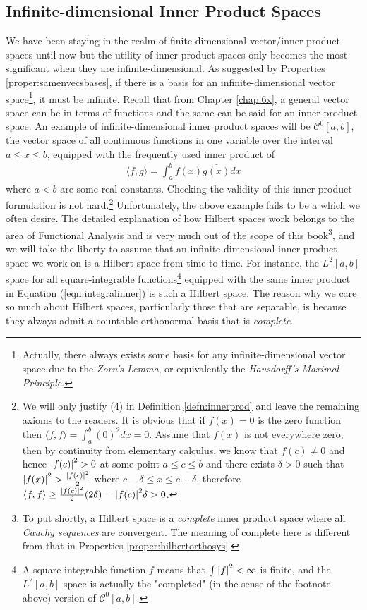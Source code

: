 \subsection{Infinite-dimensional Inner Product Spaces}
\label{section:infinner}

We have been staying in the realm of finite-dimensional vector/inner product spaces until now but the utility of inner product spaces only becomes the most significant when they are infinite-dimensional. As suggested by Properties \ref{proper:samenvecsbases}, if there is a basis for an infinite-dimensional vector space\footnote{Actually, there always exists some basis for any infinite-dimensional vector space due to the \textit{Zorn's Lemma}, or equivalently the \textit{Hausdorff's Maximal Principle}.}, it must be infinite. Recall that from Chapter \ref{chap:6x}, a general vector space can be in terms of functions and the same can be said for an inner product space. An example of infinite-dimensional inner product spaces will be $\mathcal{C}^0[a,b]$, the vector space of all continuous functions in one variable over the interval $a \leq x \leq b$, equipped with the frequently used inner product of
\begin{align}
\langle f,g \rangle = \int_a^b f(x) \overline{g(x)} dx \label{eqn:integralinner}
\end{align}
where $a < b$ are some real constants. Checking the validity of this inner product formulation is not hard.\footnote{We will only justify (4) in Definition \ref{defn:innerprod} and leave the remaining axioms to the readers. It is obvious that if $f(x) = 0$ is the zero function then $\langle f,f \rangle = \int_a^b (0)^2 dx = 0$. Assume that $f(x)$ is not everywhere zero, then by continuity from elementary calculus, we know that $f(c) \neq 0$ and hence $\abs{f(c)}^2 > 0$ at some point $a \leq c \leq b$ and there exists $\delta > 0$ such that $\abs{f(x)}^2 > \frac{\abs{f(c)}^2}{2}$ where $c-\delta \leq x \leq c+\delta$, therefore $\langle f,f \rangle \geq \frac{\abs{f(c)}^2}{2} (2\delta) = \abs{f(c)}^2 \delta > 0$.} 
Unfortunately, the above example fails to be a  which we often desire. The detailed explanation of how Hilbert spaces work belongs to the area of Functional Analysis and is very much out of the scope of this book\footnote{To put shortly, a Hilbert space is a \textit{complete} inner product space where all \textit{Cauchy sequences} are convergent. The meaning of complete here is different from that in Properties \ref{proper:hilbertorthosys}.}, and we will take the liberty to assume that an infinite-dimensional inner product space we work on is a  Hilbert space from time to time. For instance, the $L^2[a,b]$ space for all square-integrable functions\footnote{A square-integrable function $f$ means that $\int \abs{f}^2 < \infty$ is finite, and the $L^2[a,b]$ space is actually the "completed" (in the sense of the footnote above) version of $\mathcal{C}^0[a,b]$.} equipped with the same inner product in Equation (\ref{eqn:integralinner}) is such a Hilbert space. The reason why we care so much about Hilbert spaces, particularly those that are separable, is because they always admit a countable orthonormal basis that is \textit{complete}.
